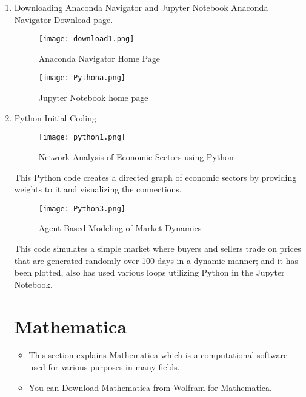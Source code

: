 \documentclass[12pt]{article}
\begin{document}
\begin{enumerate}

\item Downloading Anaconda Navigator and Jupyter Notebook \href{https://www.anaconda.com/products/navigator}{Anaconda Navigator Download page}.

\begin{figure}[H]
    \centering
    \texttt{[image: download1.png]}
    \caption{Anaconda Navigator Home Page}
    \label{fig:anaconda_home}
\end{figure}

\begin{figure}[H]
    \centering
    \texttt{[image: Pythona.png]}
    \caption{Jupyter Notebook home page}
    \label{fig:jupyter_home}
\end{figure}

\newpage 

\item Python Initial Coding 

\begin{figure}[H]
    \centering
    \texttt{[image: python1.png]}
    \caption{Network Analysis of Economic Sectors using Python}
    \label{fig:python_network_analysis}
\end{figure}

This Python code creates a directed graph of economic sectors by providing weights to it and visualizing the connections.

\begin{figure}[H]
    \centering
    \texttt{[image: Python3.png]}
    \caption{Agent-Based Modeling of Market Dynamics}
    \label{fig:python_agent_based_modeling}
\end{figure}

\newpage 

This code simulates a simple market where buyers and sellers trade on prices that are generated randomly over 100 days in a dynamic manner; and it has been plotted, also has used various loops utilizing Python in the Jupyter Notebook. 

\section{Mathematica}
\begin{itemize}
    
\item This section explains Mathematica which is a computational software used for various purposes in many fields. 
 \item You can Download Mathematica from \href{https://wolfram.com/siteinfo/}{Wolfram for Mathematica}.


\end{itemize}
\end{enumerate}
\end{document}
